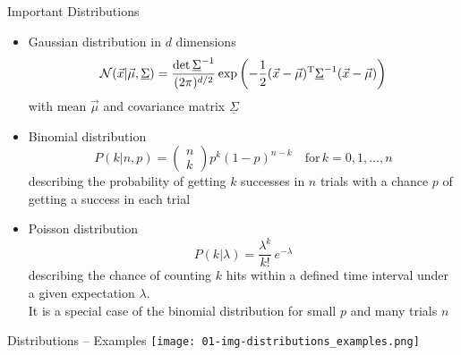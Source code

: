   \begin{frame}{Important Distributions}
    \begin{itemize}
      \item Gaussian distribution in $d$ dimensions
        \begin{equation*}
          \mathcal{N}(\vec{x}|\vec{\mu},\underline{\Sigma})
          = \frac{\det{\underline{\Sigma}^{-1}}}{(2\pi)^{d/2}}
            \exp\left(
              -\frac{1}{2} (\vec{x}-\vec{\mu})^{\text{T}}
              \underline{\Sigma}^{-1} (\vec{x}-\vec{\mu})
            \right)
        \end{equation*}
        with mean $\vec{\mu}$ and covariance matrix $\underline{\Sigma}$
      \item Binomial distribution
        \begin{equation*}
          P(k|n,p) = \begin{pmatrix} n \\ k \end{pmatrix} p^k (1-p)^{n-k}
          \quad\text{for}\, k = 0, 1, \dots, n
        \end{equation*}
        describing the probability of getting $k$ successes in $n$ trials with a chance $p$ of getting a success in each trial
      \item Poisson distribution
      \begin{equation*}
        P(k|\lambda) = \frac{\lambda^k}{k!}\,e^{-\lambda}
      \end{equation*}
      describing the chance of counting $k$ hits within a defined time interval under a given expectation $\lambda$.\\
      It is a special case of the binomial distribution for small $p$ and many trials $n$
    \end{itemize}
  \end{frame}

  \begin{frame}{Distributions -- Examples}
    \texttt{[image: 01-img-distributions\_examples.png]}
  \end{frame}

